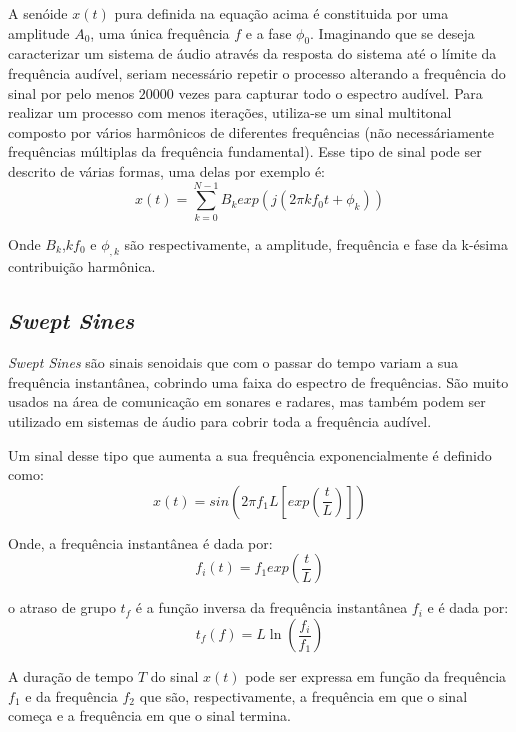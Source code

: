 A senóide $x(t)$ pura definida na equação acima é constituida por uma amplitude $A_{0}$, uma única frequência $f$ e a fase $\phi_{0}$. Imaginando que se deseja caracterizar um sistema de áudio através da resposta do sistema até o límite da frequência audível, seriam necessário repetir o processo alterando a frequência do sinal por pelo menos $20000$ vezes para capturar todo o espectro audível.
Para realizar um processo com menos iterações, utiliza-se um sinal multitonal composto por vários harmônicos de diferentes frequências (não necessáriamente frequências múltiplas da frequência fundamental). Esse tipo de sinal pode ser descrito de várias formas, uma delas por exemplo é:
\begin{equation}
x(t) = \sum_{k=0}^{N-1}B_{k} exp(j (2\pi k f_{0} t + \phi_{k}))
\end{equation}

Onde $B_{k}$,$kf_{0}$ e $\phi_{,k}$ são respectivamente, a amplitude, frequência e fase da k-ésima contribuição harmônica.

\subsection*{\textit{Swept Sines}} \label{Sweptsines}
\textit{Swept Sines} são sinais senoidais que com o passar do tempo variam a sua frequência instantânea, cobrindo uma faixa do espectro de frequências.
São muito usados na área de comunicação em sonares e radares, mas também podem ser utilizado em sistemas de áudio para cobrir toda a frequência audível.

Um sinal desse tipo que aumenta a sua frequência exponencialmente é definido como:
\begin{equation}
x(t) = sin (2\pi f_{1}L [exp(\dfrac{t}{L})])
\label{sinal exponencial}
\end{equation}

Onde, a frequência instantânea é dada por:
\begin{equation}
f_{i}(t) = f_{1} exp(\dfrac{t}{L})
\end{equation}

o atraso de grupo $t_{f}$ é a função inversa da frequência instantânea $f_{i}$ e é dada por:
\begin{equation}
t_{f}(f) = L \ln(\dfrac{f_{i}}{f_{1}})
\end{equation}

A duração de tempo $T$ do sinal $x(t)$ pode ser expressa em função da frequência $f_{1}$ e da frequência $f_{2}$ que são, respectivamente, a frequência em que o sinal começa e a frequência em que o sinal termina\cite{novak2010nonlinear}.

